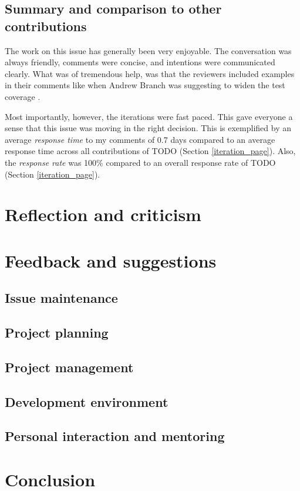 \documentclass[12pt]{scrartcl}
\let\oldsection\section
\renewcommand\section{\clearpage\oldsection}
\begin{document}
\subsection{Summary and comparison to other contributions}

The work on this issue has generally been very enjoyable. The conversation was always friendly, comments were concise, and intentions were communicated clearly. What was of tremendous help, was that the reviewers included examples in their comments like when Andrew Branch was suggesting to widen the test coverage \cite{41928Comment4}.

Most importantly, however, the iterations were fast paced. This gave everyone a sense that this issue was moving in the right decision. This is exemplified by an average \textit{response time} to my comments of 0.7 days compared to an average response time across all contributions of TODO (Section \ref{iteration_page}). Also, the \textit{response rate} was 100\% compared to an overall response rate of TODO (Section \ref{iteration_page}).

\section{Reflection and criticism}

\section{Feedback and suggestions}

\subsection{Issue maintenance}

\subsection{Project planning}

\subsection{Project management}

\subsection{Development environment}
\label{feedback_development_environment}

\subsection{Personal interaction and mentoring}

\section{Conclusion}

\printbibliography
\end{document}
